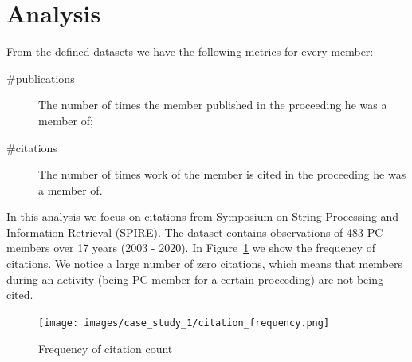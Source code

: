 \documentclass{ou-report}
\newcommand{\outline}[1]{{\color{blue} #1}}
\begin{document}



\section{Analysis}
\label{sec:cs1_analysis}

From the defined datasets we have the following metrics for every member:
\begin{description}
    \item[\#publications] The number of times the member published in the 
    proceeding he was a member of;
    \item[\#citations] The number of times work of the member is cited in the 
    proceeding he was a member of.
\end{description}

In this analysis we focus on citations from Symposium 
on String Processing and Information Retrieval (SPIRE). The dataset contains 
observations of 483 PC members over 17 years (2003 - 2020).
In Figure~\ref{fig:citation_frequency} we show the frequency of citations. We notice
a large number of zero citations, which means that members during an activity 
(being PC member for a certain proceeding) are not being cited.

\begin{figure}[H]
    \centering
    \texttt{[image: images/case\_study\_1/citation\_frequency.png]}
    \caption{Frequency of citation count}
    \label{fig:citation_frequency}
\end{figure}
\end{document}
